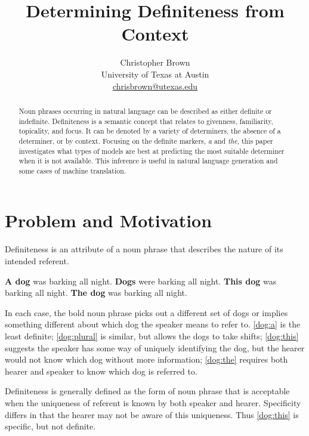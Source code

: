 \documentclass[11pt]{article}
\title{Determining Definiteness from Context}
\author{Christopher Brown\\
University of Texas at Austin\\
\href{mailto:chrisbrown@utexas.edu}{chrisbrown@utexas.edu}}
\date{}
\begin{document}
\maketitle

\begin{abstract}
\noindent
Noun phrases occurring in natural language can be described as either definite or indefinite.
Definiteness is a semantic concept that relates to givenness, familiarity, topicality, and focus.
It can be denoted by a variety of determiners, the absence of a determiner, or by context.
Focusing on the definite markers, \emph{a} and \emph{the}, this paper investigates what types of models are best at predicting the most suitable determiner when it is not available. This inference is useful in natural language generation and some cases of machine translation.
\end{abstract}


\section{Problem and Motivation} %
Definiteness is an attribute of a noun phrase that describes the nature of its intended referent.
\begin{exe}
  \ex \textbf{A dog} was barking all night. \label{dog:a}
  \ex \textbf{Dogs} were barking all night. \label{dog:plural}
  \ex \textbf{This dog} was barking all night. \label{dog:this}
  \ex \textbf{The dog} was barking all night. \label{dog:the}
\end{exe}
In each case, the bold noun phrase picks out a different set of dogs or implies something different about which dog the speaker means to refer to. \eqref{dog:a} is the least definite; \eqref{dog:plural} is similar, but allows the dogs to take shifts; \eqref{dog:this} suggests the speaker has some way of uniquely identifying the dog, but the hearer would not know which dog without more information; \eqref{dog:the} requires both hearer and speaker to know which dog is referred to.

Definiteness is generally defined as the form of noun phrase that is acceptable when the uniqueness of referent is known by both speaker and hearer. Specificity differs in that the hearer may not be aware of this uniqueness. Thus \eqref{dog:this} is specific, but not definite.
\end{document}
